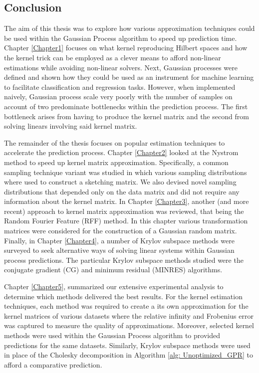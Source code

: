 \subsection{Conclusion}\label{Section5.4}

The aim of this thesis was to explore how various approximation techniques could be used within the Gaussian Process algorithm to speed up prediction time. Chapter \ref{Chapter1} focuses on what kernel reproducing Hilbert spaces and how the kernel trick can be employed as a clever means to afford non-linear estimations while avoiding non-linear solvers. Next, Gaussian processes were defined and shown how they could be used as an instrument for machine learning to facilitate classification and regression tasks. However, when implemented naively, Gaussian process scale very poorly with the number of samples on account of two predominate bottlenecks within the prediction process. The first bottleneck arises from having to produce the kernel matrix and the second from solving linears involving said kernel matrix.

The remainder of the thesis focuses on popular estimation techniques to accelerate the prediction process. Chapter \ref{Chapter2} looked at the Nystrom method to speed up kernel matrix approximation. Specifically, a common sampling technique variant was studied in which various sampling distributions where used to construct a sketching matrix. We also devised novel sampling distributions that depended only on the data matrix and did not require any information about the kernel matrix. In Chapter \ref{Chapter3}, another (and more recent) approach to kernel matrix approximation was reviewed, that being the Random Fourier Feature (RFF) method. In this chapter various transformation matrices were considered for the construction of a Gaussian random matrix. Finally, in Chapter \ref{Chapter4}, a number of Krylov subspace methods were surveyed to seek alternative ways of solving linear systems within Gaussian process predictions. The particular Krylov subspace methods studied were the conjugate gradient (CG) and minimum residual (MINRES) algorithms.

Chapter \ref{Chapter5}, summarized our extensive experimental analysis to determine which methods delivered the best results. For the kernel estimation techniques, each method was required to create a its own approximation for the kernel matrices of various datasets where the relative infinity and Frobenius error was captured to measure the quality of approximations. Moreover, selected kernel methods were used within the Gaussian Process algorithm to provided predictions for the same datasets. Similarly, Krylov subspace methods were used in place of the Cholesky decomposition in Algorithm \ref{alg: Unoptimized_GPR} to afford a comparative prediction.

